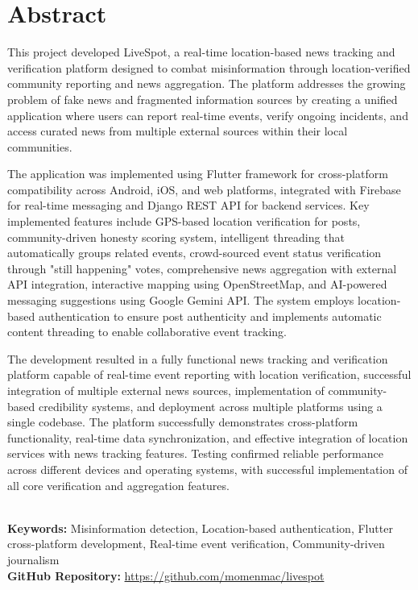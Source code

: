 \chapter*{\center \Large  Abstract}

This project developed LiveSpot, a real-time location-based news tracking and verification platform designed to combat misinformation through location-verified community reporting and news aggregation. The platform addresses the growing problem of fake news and fragmented information sources by creating a unified application where users can report real-time events, verify ongoing incidents, and access curated news from multiple external sources within their local communities.

The application was implemented using Flutter framework for cross-platform compatibility across Android, iOS, and web platforms, integrated with Firebase for real-time messaging and Django REST API for backend services. Key implemented features include GPS-based location verification for posts, community-driven honesty scoring system, intelligent threading that automatically groups related events, crowd-sourced event status verification through "still happening" votes, comprehensive news aggregation with external API integration, interactive mapping using OpenStreetMap, and AI-powered messaging suggestions using Google Gemini API. The system employs location-based authentication to ensure post authenticity and implements automatic content threading to enable collaborative event tracking.

The development resulted in a fully functional news tracking and verification platform capable of real-time event reporting with location verification, successful integration of multiple external news sources, implementation of community-based credibility systems, and deployment across multiple platforms using a single codebase. The platform successfully demonstrates cross-platform functionality, real-time data synchronization, and effective integration of location services with news tracking features. Testing confirmed reliable performance across different devices and operating systems, with successful implementation of all core verification and aggregation features.


~\\[1cm]
\noindent %
\textbf{Keywords:} Misinformation detection, Location-based authentication, Flutter cross-platform development, Real-time event verification, Community-driven journalism\\[0.5 cm]
\noindent
\textbf{GitHub Repository:} \url{https://github.com/momenmac/livespot}

\vfill
